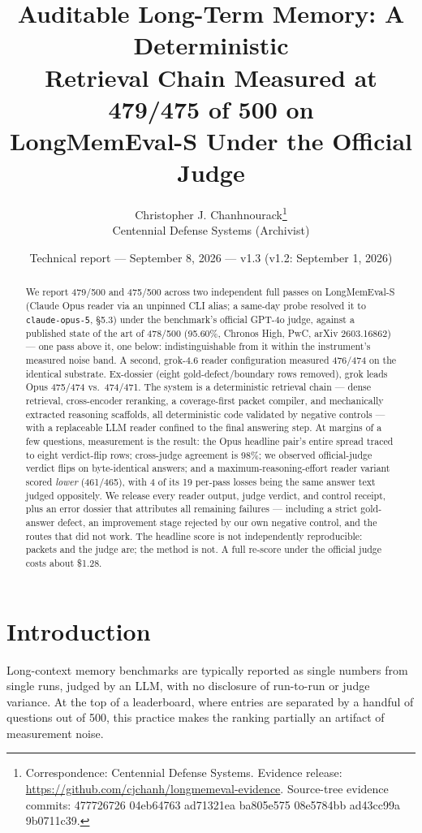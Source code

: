 \documentclass[11pt]{article}
\title{\textbf{Auditable Long-Term Memory: A Deterministic\\Retrieval Chain Measured at 479/475 of 500 on\\LongMemEval-S Under the Official Judge}}
\author{Christopher J. Chanhnourack\thanks{Correspondence: Centennial Defense Systems. Evidence release: \url{https://github.com/cjchanh/longmemeval-evidence}. Source-tree evidence commits: 477726726 \textperiodcentered{} 04eb64763 \textperiodcentered{} ad71321ea \textperiodcentered{} ba805e575 \textperiodcentered{} 08e5784bb \textperiodcentered{} ad43cc99a \textperiodcentered{} 9b0711c39.}\\Centennial Defense Systems (Archivist)}
\date{Technical report --- September 8, 2026 --- v1.3 (v1.2: September 1, 2026)}
\begin{document}
\maketitle

\begin{abstract}
\noindent We report 479/500 and 475/500 across two independent full passes on
LongMemEval-S (Claude Opus reader via an unpinned CLI alias; a same-day probe resolved it to \texttt{claude-opus-5}, \S5.3) under the benchmark's official GPT-4o
judge, against a published state of the art of 478/500 (95.60\%,
Chronos High, PwC, arXiv 2603.16862) --- one pass above it, one below:
indistinguishable from it within the instrument's measured noise band.
A second, grok-4.6 reader configuration measured 476/474 on the identical
substrate. Ex-dossier (eight gold-defect/boundary rows removed), grok leads
Opus 475/474 vs.\ 474/471. The system is a deterministic retrieval chain --- dense retrieval,
cross-encoder reranking, a coverage-first packet compiler, and mechanically
extracted reasoning scaffolds, all deterministic code validated by negative
controls --- with a replaceable LLM reader confined to the final answering step.
At margins of a few questions, measurement is the result: the Opus headline pair's entire
spread traced to eight verdict-flip rows; cross-judge agreement is 98\%; we
observed official-judge verdict flips on byte-identical answers; and a
maximum-reasoning-effort reader variant scored \emph{lower} (461/465), with 4
of its 19 per-pass losses being the same answer text judged oppositely. We release
every reader output, judge verdict, and control receipt, plus an error dossier
that attributes all remaining failures --- including a strict gold-answer
defect, an improvement stage rejected by our own negative control, and the
routes that did not work. The headline score is not independently
reproducible: packets and the judge are; the method is not. A full re-score
under the official judge costs about \$1.28.
\end{abstract}

\section{Introduction}
Long-context memory benchmarks are typically reported as single numbers from
single runs, judged by an LLM, with no disclosure of run-to-run or judge
variance. At the top of a leaderboard, where entries are separated by a handful
of questions out of 500, this practice makes the ranking partially an artifact
of measurement noise.
\end{document}
